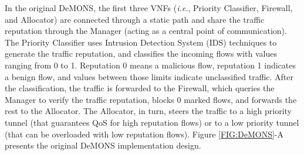 
In the original DeMONS, the first three VNFs (\textit{i.e.}, Priority Classifier, Firewall, and Allocator) are connected through a static path and share the traffic reputation through the Manager (acting as a central point of communication). The Priority Classifier uses Intrusion Detection System (IDS) techniques to generate the traffic reputation, and classifies the incoming flows with values ranging from 0 to 1. Reputation 0 means a malicious flow, reputation 1 indicates a benign flow, and values between those limits indicate unclassified traffic. After the classification, the traffic is forwarded to the Firewall, which queries the Manager to verify the traffic reputation, blocks 0 marked flows, and forwards the rest to the Allocator. The Allocator, in turn, steers the traffic to a high priority tunnel (that guarantees QoS for high reputation flows) or to a low priority tunnel (that can be overloaded with low reputation flows). Figure \ref{FIG:DeMONS}-A presents the original DeMONS implementation design.


